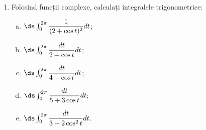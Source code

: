\begin{enumerate}[(1)]
    \item Folosind funcții complexe, calculați integralele trigonometrice:
    \begin{enumerate}[(a)]
        \item $ \ds\int_0^{2\pi} \dfrac{1}{(2 + \cos t)^2} dt $;
        \item $ \ds\int_0^{2\pi} \dfrac{dt}{2 + \cos t} dt $;
        \item $ \ds\int_0^{2 \pi} \dfrac{dt}{4 + \cos t} dt $;
        \item $ \ds\int_0^{2\pi} \dfrac{dt}{5 + 3 \cos t} dt $;
        \item $ \ds\int_0^{2\pi} \dfrac{dt}{3 + 2 \cos^2 t} dt $.
    \end{enumerate}
\end{enumerate}